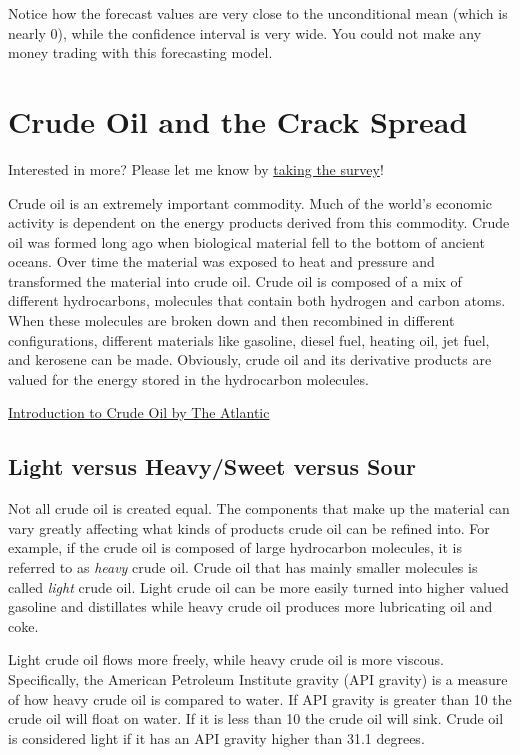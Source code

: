\documentclass[
  letterpaper,
  DIV=11,
  numbers=noendperiod]{scrreprt}
\begin{document}
Notice how the forecast values are very close to the unconditional mean
(which is nearly 0), while the confidence interval is very wide. You
could not make any money trading with this forecasting model.


\chapter{Crude Oil and the Crack
Spread}\label{crude-oil-and-the-crack-spread}

{Interested in more? Please let me know by}
\href{https://forms.gle/Q3VByCQZHjfQSy9D7}{taking the survey}!

Crude oil is an extremely important commodity. Much of the world's
economic activity is dependent on the energy products derived from this
commodity. Crude oil was formed long ago when biological material fell
to the bottom of ancient oceans. Over time the material was exposed to
heat and pressure and transformed the material into crude oil. Crude oil
is composed of a mix of different hydrocarbons, molecules that contain
both hydrogen and carbon atoms. When these molecules are broken down and
then recombined in different configurations, different materials like
gasoline, diesel fuel, heating oil, jet fuel, and kerosene can be made.
Obviously, crude oil and its derivative products are valued for the
energy stored in the hydrocarbon molecules.

\href{https://www.youtube.com/watch?v=62LvVYYqUFA}{Introduction to Crude
Oil by The Atlantic}

\section{Light versus Heavy/Sweet versus
Sour}\label{light-versus-heavysweet-versus-sour}

Not all crude oil is created equal. The components that make up the
material can vary greatly affecting what kinds of products crude oil can
be refined into. For example, if the crude oil is composed of large
hydrocarbon molecules, it is referred to as \emph{heavy} crude oil.
Crude oil that has mainly smaller molecules is called \emph{light} crude
oil. Light crude oil can be more easily turned into higher valued
gasoline and distillates while heavy crude oil produces more lubricating
oil and coke.

Light crude oil flows more freely, while heavy crude oil is more
viscous. Specifically, the American Petroleum Institute gravity (API
gravity) is a measure of how heavy crude oil is compared to water. If
API gravity is greater than 10 the crude oil will float on water. If it
is less than 10 the crude oil will sink. Crude oil is considered light
if it has an API gravity higher than 31.1 degrees.
\end{document}
